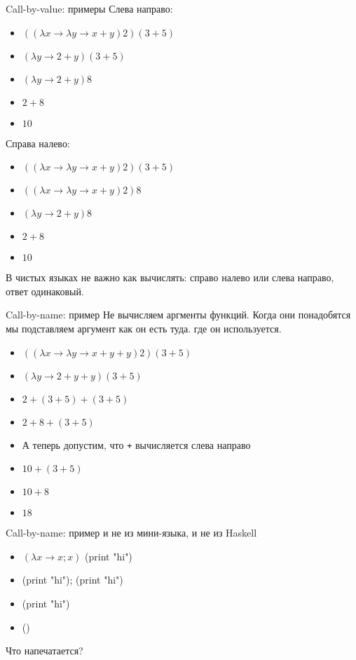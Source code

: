 \documentclass[
  xcolor={svgnames},
  hyperref={colorlinks,citecolor=DeepPink4,linkcolor=DarkRed,urlcolor=DarkBlue}]{beamer}
\begin{document}
\begin{frame}[fragile]{Call-by-value: примеры}
Слева направо:
\begin{itemize}
 \item $((\lambda x \rightarrow \lambda y \rightarrow x + y) 2) (3+5)$
 \item $(\lambda y \rightarrow 2 + y) (3+5)$
 \item $(\lambda y \rightarrow 2 + y) 8$
 \item $2+8$
 \item $10$
\end{itemize}
Справа налево:
\begin{itemize}
 \item $((\lambda x \rightarrow \lambda y \rightarrow x + y) 2) (3+5)$
 \item $((\lambda x \rightarrow \lambda y \rightarrow x + y) 2) 8$
 \item $(\lambda y \rightarrow 2 + y) 8$
 \item $2+8$
 \item $10$
\end{itemize}
В чистых языках не важно как вычислять: справо налево или слева направо, ответ одинаковый.
\end{frame}

\begin{frame}[fragile]{Call-by-name: пример}
Не вычисляем аргменты функций. Когда они понадобятся мы подставляем аргумент как он есть туда. где он используется.
\vspace{1cm}
\begin{itemize}
 \item $((\lambda x \rightarrow \lambda y \rightarrow x + y + y) 2) (3+5)$
 \item $(\lambda y \rightarrow 2 + y + y) (3+5)$
 \item $2 + (3+5) + (3+5)$
 \item $2 + 8 + (3+5)$ 
 \item А теперь допустим, что \verb=+= вычисляется слева направо
 \item $10 + (3+5)$
 \item $10+8$
 \item $18$
\end{itemize}
\end{frame}

\begin{frame}[fragile]{Call-by-name: пример и не из мини-языка, и не из Haskell}
\begin{itemize}
 \item $(\lambda x \rightarrow x; x)$ (print "hi")
 \item (print "hi"); (print "hi")
 \item (print "hi")
 \item ()
\end{itemize}
{\Large \faQuestion} Что напечатается?
\end{frame}
\end{document}
